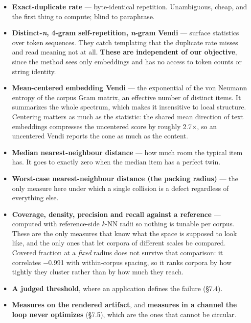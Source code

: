 \documentclass[
  10pt,
]{article}
\providecommand{\tightlist}{%
  \setlength{\itemsep}{0pt}\setlength{\parskip}{0pt}}
\theoremstyle{plain}
\theoremstyle{definition}
\providecommand{\tightlist}{\setlength{\itemsep}{0pt}\setlength{\parskip}{0pt}}
\begin{document}
\begin{itemize}
\tightlist
\item
  \textbf{Exact-duplicate rate} --- byte-identical repetition.
  Unambiguous, cheap, and the first thing to compute; blind to
  paraphrase.
\item
  \textbf{Distinct-\emph{n}, 4-gram self-repetition, \emph{n}-gram
  Vendi} --- surface statistics over token sequences. They catch
  templating that the duplicate rate misses and read meaning not at all.
  \textbf{These are independent of our objective}, since the method sees
  only embeddings and has no access to token counts or string identity.
\item
  \textbf{Mean-centered embedding Vendi} --- the exponential of the von
  Neumann entropy of the corpus Gram matrix, an effective number of
  distinct items. It summarizes the whole spectrum, which makes it
  insensitive to local structure. Centering matters as much as the
  statistic: the shared mean direction of text embeddings compresses the
  uncentered score by roughly 2.7×, so an uncentered Vendi reports the
  cone as much as the content.
\item
  \textbf{Median nearest-neighbour distance} --- how much room the
  typical item has. It goes to exactly zero when the median item has a
  perfect twin.
\item
  \textbf{Worst-case nearest-neighbour distance (the packing radius)}
  --- the only measure here under which a single collision is a defect
  regardless of everything else.
\item
  \textbf{Coverage, density, precision and recall against a reference}
  --- computed with reference-side \emph{k}-NN radii so nothing is
  tunable per corpus. These are the only measures that know what the
  space is supposed to look like, and the only ones that let corpora of
  different scales be compared. Covered fraction at a \emph{fixed}
  radius does not survive that comparison: it correlates −0.991 with
  within-corpus spacing, so it ranks corpora by how tightly they cluster
  rather than by how much they reach.
\item
  \textbf{A judged threshold}, where an application defines the failure
  (§7.4).
\item
  \textbf{Measures on the rendered artifact}, and \textbf{measures in a
  channel the loop never optimizes} (§7.5), which are the ones that
  cannot be circular.
\end{itemize}
\end{document}

